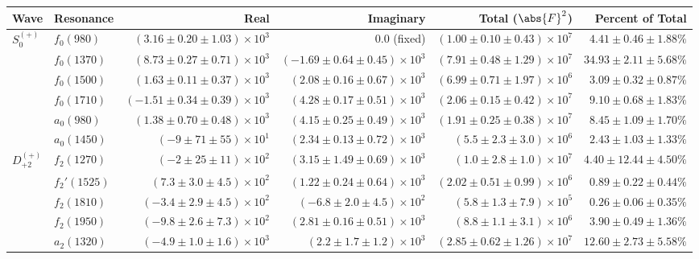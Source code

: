 \begin{table}[ht]
    \begin{center}
        \begin{tabular}{llrrrr}\toprule
        Wave & Resonance & Real & Imaginary & Total ($\abs{F}^2$) & Percent of Total \\\midrule
$S_{0}^{(+)}$ & $f_{0}(980)$ & $(3.16 \pm 0.20 \pm 1.03) \times 10^{3}$ & $0.0$ (fixed) & $(1.00 \pm 0.10 \pm 0.43) \times 10^{7}$ & $4.41 \pm 0.46 \pm 1.88 \%$ \\
 & $f_{0}(1370)$ & $(8.73 \pm 0.27 \pm 0.71) \times 10^{3}$ & $(-1.69 \pm 0.64 \pm 0.45) \times 10^{3}$ & $(7.91 \pm 0.48 \pm 1.29) \times 10^{7}$ & $34.93 \pm 2.11 \pm 5.68 \%$ \\
 & $f_{0}(1500)$ & $(1.63 \pm 0.11 \pm 0.37) \times 10^{3}$ & $(2.08 \pm 0.16 \pm 0.67) \times 10^{3}$ & $(6.99 \pm 0.71 \pm 1.97) \times 10^{6}$ & $3.09 \pm 0.32 \pm 0.87 \%$ \\
 & $f_{0}(1710)$ & $(-1.51 \pm 0.34 \pm 0.39) \times 10^{3}$ & $(4.28 \pm 0.17 \pm 0.51) \times 10^{3}$ & $(2.06 \pm 0.15 \pm 0.42) \times 10^{7}$ & $9.10 \pm 0.68 \pm 1.83 \%$ \\
 & $a_{0}(980)$ & $(1.38 \pm 0.70 \pm 0.48) \times 10^{3}$ & $(4.15 \pm 0.25 \pm 0.49) \times 10^{3}$ & $(1.91 \pm 0.25 \pm 0.38) \times 10^{7}$ & $8.45 \pm 1.09 \pm 1.70 \%$ \\
 & $a_{0}(1450)$ & $(-9 \pm 71 \pm 55) \times 10^{1}$ & $(2.34 \pm 0.13 \pm 0.72) \times 10^{3}$ & $(5.5 \pm 2.3 \pm 3.0) \times 10^{6}$ & $2.43 \pm 1.03 \pm 1.33 \%$ \\
$D_{+2}^{(+)}$ & $f_{2}(1270)$ & $(-2 \pm 25 \pm 11) \times 10^{2}$ & $(3.15 \pm 1.49 \pm 0.69) \times 10^{3}$ & $(1.0 \pm 2.8 \pm 1.0) \times 10^{7}$ & $4.40 \pm 12.44 \pm 4.50 \%$ \\
 & $f_{2}'(1525)$ & $(7.3 \pm 3.0 \pm 4.5) \times 10^{2}$ & $(1.22 \pm 0.24 \pm 0.64) \times 10^{3}$ & $(2.02 \pm 0.51 \pm 0.99) \times 10^{6}$ & $0.89 \pm 0.22 \pm 0.44 \%$ \\
 & $f_{2}(1810)$ & $(-3.4 \pm 2.9 \pm 4.5) \times 10^{2}$ & $(-6.8 \pm 2.0 \pm 4.5) \times 10^{2}$ & $(5.8 \pm 1.3 \pm 7.9) \times 10^{5}$ & $0.26 \pm 0.06 \pm 0.35 \%$ \\
 & $f_{2}(1950)$ & $(-9.8 \pm 2.6 \pm 7.3) \times 10^{2}$ & $(2.81 \pm 0.16 \pm 0.51) \times 10^{3}$ & $(8.8 \pm 1.1 \pm 3.1) \times 10^{6}$ & $3.90 \pm 0.49 \pm 1.36 \%$ \\
 & $a_{2}(1320)$ & $(-4.9 \pm 1.0 \pm 1.6) \times 10^{3}$ & $(2.2 \pm 1.7 \pm 1.2) \times 10^{3}$ & $(2.85 \pm 0.62 \pm 1.26) \times 10^{7}$ & $12.60 \pm 2.73 \pm 5.58 \%$ \\

\end{tabular}
\end{center}
\end{table}
